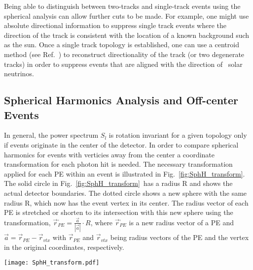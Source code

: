 Being able to distinguish between two-tracks and single-track events using the spherical analysis can allow further cuts to be made.  For example, one might use absolute directional information to suppress single track events where the direction of the track is consistent with the location of a known background such as the sun. Once a single track topology is established, one can use a centroid method (see Ref.~\cite{Directionality}) to reconstruct directionality of the track (or two degenerate tracks) in order to suppress events that are aligned with the direction of \B~solar neutrinos.


\subsection{Spherical Harmonics Analysis and Off-center Events}

In general, the power spectrum $S_l$ is rotation invariant for a given topology only if events originate in the center of the
detector. In order to compare spherical harmonics for events with verticies away from the center a coordinate transformation for each photon 
hit is needed. The necessary transformation applied for each PE within an event is illustrated in Fig.~\ref{fig:SphH_transform}. 
The solid circle in Fig.~\ref{fig:SphH_transform}~has a radius R and shows the actual detector boundaries. The dotted circle shows a new 
sphere with the same radius R, which now has the event vertex in its center. The radius vector of each PE is stretched or shorten to 
its intersection with this new sphere using the transformation, $\vec{r}^{,}_{PE} = \frac{\vec{a}}{|\vec{a}|} \cdot R$, 
where $\vec{r}^{,}_{PE}$ is a new radius vector of a PE and $\vec{a}=\vec{r}_{PE} - \vec{r}_{vtx}$ with $\vec{r}_{PE}$ and $\vec{r}_{vtx}$ 
being radius vectors of the PE and the vertex in the original coordinates, respectively.

\begin{figure*}[h]
  \centering
  \texttt{[image: SphH\_transform.pdf]}
  \caption{Coordinate transformation applied to events that are
    off-center. Solid circle schematically shows actual detector
    boundaries. Dotted circle shows a new sphere of radius R$=$6.5~m
    with the event vertex position in the center. The radius vector of
    each photon hit is stretched or shorten until intersection with
    this new sphere using transformation $\vec{r}^{,}_{hit} =
    \frac{\vec{a}}{|\vec{a}|} \cdot R$. Where $\vec{r}^{,}_{hit}$ is a
    new radius vector of the photon hit, $R$ is detector sphere radius,
    and $\vec{a}=\vec{r}_{hit} - \vec{r}_{vtx}$ with $\vec{r}_{hit}$
    and $\vec{r}_{vtx}$ being radius vectors of the photon hit and
    vertex position in original coordinates and correspondingly.}
  \label{fig:SphH_transform}
\end{figure*}


